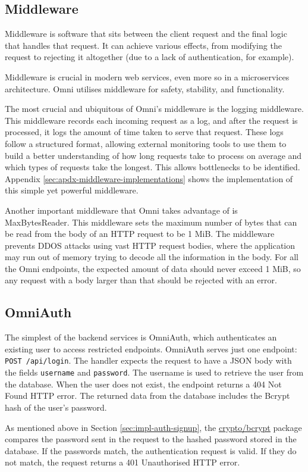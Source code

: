 \subsection{Middleware}
Middleware is software that sits between the client request and the final logic that handles that request.
It can achieve various effects, from modifying the request to rejecting it altogether (due to a lack of authentication, for example). 

Middleware is crucial in modern web services, even more so in a microservices architecture.
Omni utilises middleware for safety, stability, and functionality. 

The most crucial and ubiquitous of Omni's middleware is the logging middleware.
This middleware records each incoming request as a log, and after the request is processed, it logs the amount of time taken to serve that request. 
These logs follow a structured format, allowing external monitoring tools to use them to build a better understanding of how long requests take to process on average and which types of requests take the longest.
This allows bottlenecks to be identified. Appendix \ref{sec:apdx-middleware-implementations} shows the implementation of this simple yet powerful middleware.

Another important middleware that Omni takes advantage of is MaxBytesReader.
This middleware sets the maximum number of bytes that can be read from the body of an HTTP request to be 1 MiB.
The middleware prevents DDOS attacks using vast HTTP request bodies, where the application may run out of memory trying to decode all the information in the body.
For all the Omni endpoints, the expected amount of data should never exceed 1 MiB, so any request with a body larger than that should be rejected with an error.

\subsection{OmniAuth}
The simplest of the backend services is OmniAuth, which authenticates an existing user to access restricted endpoints.
OmniAuth serves just one endpoint: \verb|POST /api/login|. The handler expects the request to have a JSON body with the fields \verb|username| and \verb|password|. 
The username is used to retrieve the user from the database. When the user does not exist, the endpoint returns a 404 Not Found HTTP error.
The returned data from the database includes the Bcrypt hash of the user's password. 

As mentioned above in Section \ref{sec:impl-auth-signup}, the \underline{\href{https://pkg.go.dev/golang.org/x/crypto/bcrypt}{crypto/bcrypt}} \nocite{gobcryptpkg} package compares the password sent in the request to the hashed password stored in the database.
If the passwords match, the authentication request is valid. If they do not match, the request returns a 401 Unauthorised HTTP error.

